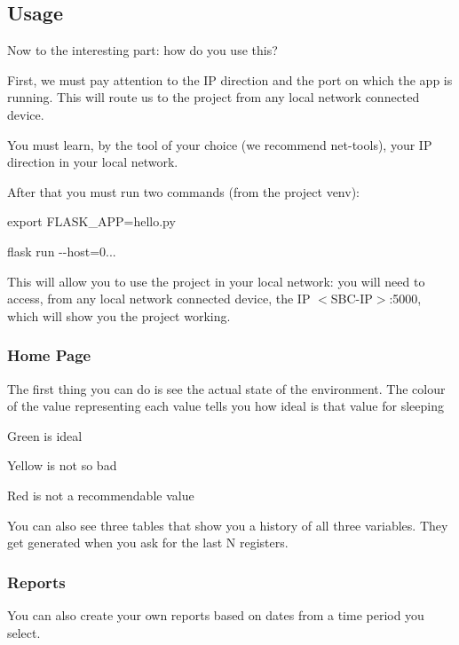 \subsection*{Usage}

Now to the interesting part\+: how do you use this?

First, we must pay attention to the IP direction and the port on which the app is running. This will route us to the project from any local network connected device.

You must learn, by the tool of your choice (we recommend net-\/tools), your IP direction in your local network.

After that you must run two commands (from the project venv)\+:

{\ttfamily export F\+L\+A\+S\+K\+\_\+\+A\+PP=hello.\+py}

{\ttfamily flask run -\/-\/host=0...}

This will allow you to use the project in your local network\+: you will need to access, from any local network connected device, the IP $<$S\+B\+C-\/\+IP$>$\+:5000, which will show you the project working.

\subsubsection*{Home Page}



The first thing you can do is see the actual state of the environment. The colour of the value representing each value tells you how ideal is that value for sleeping
\begin{DoxyItemize}
\item Green is ideal
\item Yellow is not so bad
\item Red is not a recommendable value
\end{DoxyItemize}



You can also see three tables that show you a history of all three variables. They get generated when you ask for the last N registers.

\subsubsection*{Reports}

You can also create your own reports based on dates from a time period you select.



